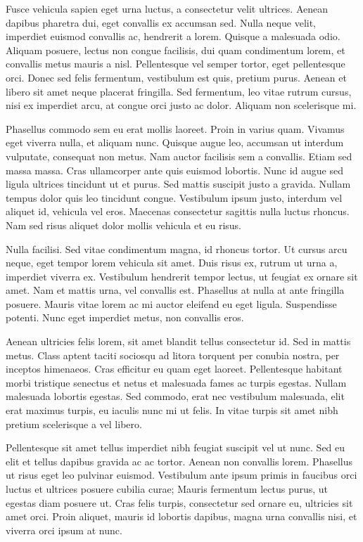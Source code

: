 Fusce vehicula sapien eget urna luctus, a consectetur velit ultrices. Aenean dapibus pharetra dui, eget convallis ex accumsan sed. Nulla neque velit, imperdiet euismod convallis ac, hendrerit a lorem. Quisque a malesuada odio. Aliquam posuere, lectus non congue facilisis, dui quam condimentum lorem, et convallis metus mauris a nisl. Pellentesque vel semper tortor, eget pellentesque orci. Donec sed felis fermentum, vestibulum est quis, pretium purus. Aenean et libero sit amet neque placerat fringilla. Sed fermentum, leo vitae rutrum cursus, nisi ex imperdiet arcu, at congue orci justo ac dolor. Aliquam non scelerisque mi.

Phasellus commodo sem eu erat mollis laoreet. Proin in varius quam. Vivamus eget viverra nulla, et aliquam nunc. Quisque augue leo, accumsan ut interdum vulputate, consequat non metus. Nam auctor facilisis sem a convallis. Etiam sed massa massa. Cras ullamcorper ante quis euismod lobortis. Nunc id augue sed ligula ultrices tincidunt ut et purus. Sed mattis suscipit justo a gravida. Nullam tempus dolor quis leo tincidunt congue. Vestibulum ipsum justo, interdum vel aliquet id, vehicula vel eros. Maecenas consectetur sagittis nulla luctus rhoncus. Nam sed risus aliquet dolor mollis vehicula et eu risus.

Nulla facilisi. Sed vitae condimentum magna, id rhoncus tortor. Ut cursus arcu neque, eget tempor lorem vehicula sit amet. Duis risus ex, rutrum ut urna a, imperdiet viverra ex. Vestibulum hendrerit tempor lectus, ut feugiat ex ornare sit amet. Nam et mattis urna, vel convallis est. Phasellus at nulla at ante fringilla posuere. Mauris vitae lorem ac mi auctor eleifend eu eget ligula. Suspendisse potenti. Nunc eget imperdiet metus, non convallis eros.

Aenean ultricies felis lorem, sit amet blandit tellus consectetur id. Sed in mattis metus. Class aptent taciti sociosqu ad litora torquent per conubia nostra, per inceptos himenaeos. Cras efficitur eu quam eget laoreet. Pellentesque habitant morbi tristique senectus et netus et malesuada fames ac turpis egestas. Nullam malesuada lobortis egestas. Sed commodo, erat nec vestibulum malesuada, elit erat maximus turpis, eu iaculis nunc mi ut felis. In vitae turpis sit amet nibh pretium scelerisque a vel libero.

Pellentesque sit amet tellus imperdiet nibh feugiat suscipit vel ut nunc. Sed eu elit et tellus dapibus gravida ac ac tortor. Aenean non convallis lorem. Phasellus ut risus eget leo pulvinar euismod. Vestibulum ante ipsum primis in faucibus orci luctus et ultrices posuere cubilia curae; Mauris fermentum lectus purus, ut egestas diam posuere ut. Cras felis turpis, consectetur sed ornare eu, ultricies sit amet orci. Proin aliquet, mauris id lobortis dapibus, magna urna convallis nisi, et viverra orci ipsum at nunc.

